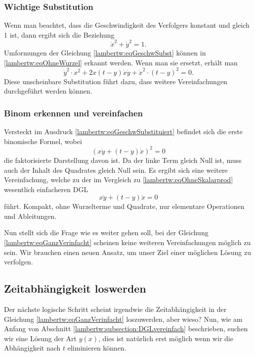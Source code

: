 \subsubsection{Wichtige Substitution
	\label{lambertw:subsubsection:WichtSubst}}
Wenn man beachtet, dass die Geschwindigkeit des Verfolgers konstant und gleich 1 ist, dann ergibt sich die Beziehung  
\begin{equation}
	\dot{x}^2 + \dot{y}^2 
	= 1.
	\label{lambertw:eqGeschwSubst}
\end{equation}
Umformungen der Gleichung \eqref{lambertw:eqGeschwSubst} können in \eqref{lambertw:eqOhneWurzel} erkannt werden. Wenn man sie ersetzt, erhält man
\begin{equation}
		\dot{y}^2 \cdot x^2 +2x \left(t-y\right) \dot{x}\dot{y} + \dot{x}^2 \cdot \left(t-y\right)^2
		=0.
		\label{lambertw:eqGeschwSubstituiert}
\end{equation}
Diese unscheinbare Substitution führt dazu, dass weitere Vereinfachungen durchgeführt werden können.

\subsubsection{Binom erkennen und vereinfachen
	\label{lambertw:subsubsection:BinomVereinfach}}
Versteckt im Ausdruck \eqref{lambertw:eqGeschwSubstituiert} befindet sich die erste binomische Formel, wobei
\begin{equation}
	(x \dot{y} + (t-y) \dot{x})^2
	= 0
	\label{lambertw:eqAlgVerinfacht}
\end{equation}
die faktorisierte Darstellung davon ist.
Da der linke Term gleich Null ist, muss auch der Inhalt des Quadrates gleich Null sein. Es ergibt sich eine weitere Vereinfachung, welche zu der im Vergleich zu \eqref{lambertw:eqOhneSkalarprod} wesentlich einfacheren DGL 
\begin{equation}
	x \dot{y} + (t-y) \dot{x}
	= 0
	\label{lambertw:eqGanzVerinfacht}
\end{equation}
führt.
Kompakt, ohne Wurzelterme und Quadrate, nur elementare Operationen und Ableitungen. 

Nun stellt sich die Frage wie es weiter gehen soll, bei der Gleichung \eqref{lambertw:eqGanzVerinfacht} scheinen keine weiteren Vereinfachungen möglich zu sein. Wir brauchen einen neuen Ansatz, um unser Ziel einer möglichen Lösung zu verfolgen.

\subsection{Zeitabhängigkeit loswerden
	\label{lambertw:subsection:ZeitabhLoswerden}}
Der nächste logische Schritt scheint irgendwie die Zeitabhängigkeit in der Gleichung \eqref{lambertw:eqGanzVerinfacht} loszuwerden, aber wieso? Nun, wie am Anfang von Abschnitt \ref{lambertw:subsection:DGLvereinfach} beschrieben, suchen wir eine Lösung der Art \(y(x)\), dies ist natürlich erst möglich wenn wir die Abhängigkeit nach \(t\) eliminieren können.

